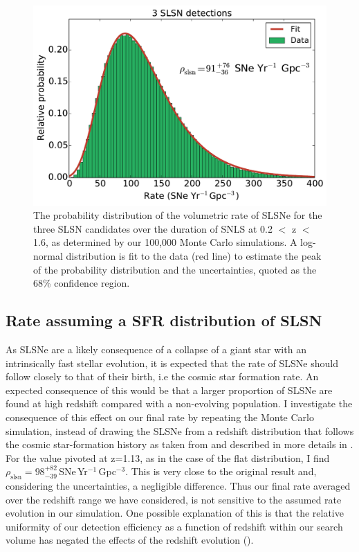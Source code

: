 \begin{figure}
\includegraphics[width=\textwidth]{Figures/Chapter3/rateFlat3}
\caption{The probability distribution of the volumetric rate of SLSNe for the three SLSN candidates over the duration of SNLS at 0.2 $<$ z $<$ 1.6, as determined by our 100,000 Monte Carlo simulations. A log-normal distribution is fit to the data (red line) to estimate the peak of the probability distribution and the uncertainties, quoted as the 68\% confidence region.}
\label{fig:rateFlat3}
\end{figure}

\subsection{Rate assuming a SFR distribution of SLSN}
\label{sec:SFRRate}
As SLSNe are a likely consequence of a collapse of a giant star with an intrinsically fast stellar evolution, it is expected that the rate of SLSNe should follow closely to that of their birth, i.e the cosmic star formation rate. An expected consequence of this would be that a larger proportion of SLSNe are found at high redshift compared with a non-evolving population. I investigate the consequence of this effect on our final rate by repeating the Monte Carlo simulation, instead of drawing the SLSNe from a redshift distribution that follows the cosmic star-formation history as taken from \citet{Hopkins2006} and described in more details in . For the value pivoted at z=1.13, as in the case of the flat distribution, I find $\rho_{\mathrm{slsn}} = 98^{+82}_{-39}$\,SNe\,Yr$^{-1}$\,Gpc$^{-3}$. This is very close to the original result and, considering the uncertainties, a negligible difference. Thus our final rate averaged over the redshift range we have considered, is not sensitive to the assumed rate evolution in our simulation. One possible explanation of this is that the relative uniformity of our detection efficiency as a function of redshift within our search volume has negated the effects of the redshift evolution ().

